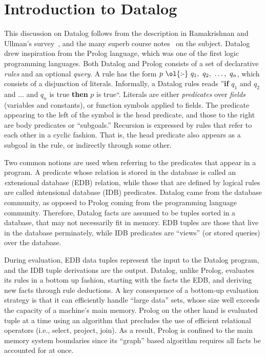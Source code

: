 \section{Introduction to Datalog}
\label{ch:p2:sec:datalog}

This discussion on Datalog follows from the description in Ramakrishnan and
Ullman's survey~\cite{deductive-database}, and the many superb course
notes~\cite{ullmanNotes} on the subject.  Datalog drew inspiration from the
Prolog language, which was one of the first logic programming languages.  Both
Datalog and Prolog consists of a set of declarative {\em rules} and an optional
{\em query}.  A rule has the form $p\ \text{\ol{:-}}\ q_1,\ q_2,\ \ldots,\ q_n$, which consists
of a disjunction of literals.  Informally, a Datalog rules reads ''{\bf if}
$q_1$ and $q_2$ and $\ldots$ and $q_n$ is true {\bf then} $p$ is true``.
Literals are either {\em predicates} over {\em fields} (variables and
constants), or function symbols applied to fields.  The predicate appearing to
the left of the \ol{:-} symbol is the head predicate, and those to the right
are body predicates or ``subgoals.'' Recursion is expressed by rules that refer
to each other in a cyclic fashion.  That is, the head predicate also appears as
a subgoal in the rule, or indirectly through some other.

Two common notions are used when referring to the predicates that appear in a
program.  A predicate whose relation is stored in the database is called an
{\emph extensional database} (EDB) relation, while those that are defined by
logical rules are called {\emph intensional database} (IDB) predicates.  Datalog
came from the database community, as opposed to Prolog coming from the programming
language community. Therefore, Datalog facts are assumed to be tuples sorted in
a database, that may not necessarily fit in memory. EDB tuples are those that live
in the database perminately, while IDB predicates are ``views'' (or stored
queries) over the database. 

During evaluation, EDB data tuples represent the input to the Datalog program,
and the IDB tuple derivations are the output.  Datalog, unlike Prolog,
evaluates its rules in a bottom up fashion, starting with the facts the EDB,
and deriving new facts through rule deductions.  A key consequence of a
bottom-up evaluation strategy is that it can efficiently handle ``large data''
sets, whose size well exceeds the capacity of a machine's main memory.  Prolog
on the other hand is evaluated tuple at a time using an algorithm that
precludes the use of efficient relational operators (i.e., select, project,
join).  As a result, Prolog is confined to the main memory system boundaries since
its ``graph'' based algorithm requires all facts be accounted for at once.

